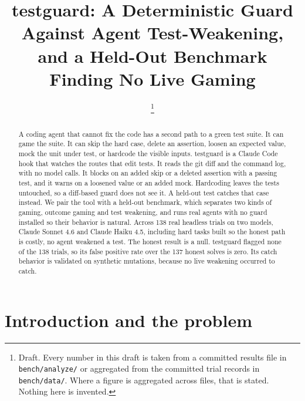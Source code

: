 \documentclass[conference]{IEEEtran}
\begin{document}
\title{testguard: A Deterministic Guard Against Agent Test-Weakening, and a Held-Out Benchmark Finding No Live Gaming}

\author{%
\IEEEauthorblockA{%
}%
\thanks{Draft. Every number in this draft is taken from a committed results file in \texttt{bench/analyze/} or aggregated from the committed trial records in \texttt{bench/data/}. Where a figure is aggregated across files, that is stated. Nothing here is invented.}%
}

\maketitle

\begin{abstract}
A coding agent that cannot fix the code has a second path to a green test suite. It can game the suite. It can skip the hard case, delete an assertion, loosen an expected value, mock the unit under test, or hardcode the visible inputs. testguard is a Claude Code hook that watches the routes that edit tests. It reads the git diff and the command log, with no model calls. It blocks on an added skip or a deleted assertion with a passing test, and it warns on a loosened value or an added mock. Hardcoding leaves the tests untouched, so a diff-based guard does not see it. A held-out test catches that case instead. We pair the tool with a held-out benchmark, which separates two kinds of gaming, outcome gaming and test weakening, and runs real agents with no guard installed so their behavior is natural. Across 138 real headless trials on two models, Claude Sonnet 4.6 and Claude Haiku 4.5, including hard tasks built so the honest path is costly, no agent weakened a test. The honest result is a null. testguard flagged none of the 138 trials, so its false positive rate over the 137 honest solves is zero. Its catch behavior is validated on synthetic mutations, because no live weakening occurred to catch.
\end{abstract}

\section{Introduction and the problem}
\end{document}
